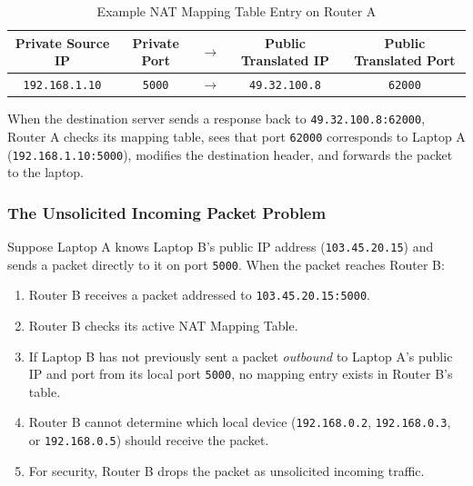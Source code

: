 \documentclass[11pt,a4paper]{article}
\begin{document}
\begin{table}[h!]
\centering
\begin{tabular}{ccccc}
\toprule
\textbf{Private Source IP} & \textbf{Private Port} & $\rightarrow$ & \textbf{Public Translated IP} & \textbf{Public Translated Port} \\
\midrule
\texttt{192.168.1.10} & \texttt{5000} & $\rightarrow$ & \texttt{49.32.100.8} & \texttt{62000} \\
\bottomrule
\end{tabular}
\caption{Example NAT Mapping Table Entry on Router A}
\label{tab:nat_table}
\end{table}

When the destination server sends a response back to \texttt{49.32.100.8:62000}, Router A checks its mapping table, sees that port \texttt{62000} corresponds to Laptop A (\texttt{192.168.1.10:5000}), modifies the destination header, and forwards the packet to the laptop.

\subsubsection{The Unsolicited Incoming Packet Problem}
Suppose Laptop A knows Laptop B's public IP address (\texttt{103.45.20.15}) and sends a packet directly to it on port \texttt{5000}.
When the packet reaches Router B:
\begin{enumerate}
    \item Router B receives a packet addressed to \texttt{103.45.20.15:5000}.
    \item Router B checks its active NAT Mapping Table.
    \item If Laptop B has not previously sent a packet \textit{outbound} to Laptop A's public IP and port from its local port \texttt{5000}, no mapping entry exists in Router B's table.
    \item Router B cannot determine which local device (\texttt{192.168.0.2}, \texttt{192.168.0.3}, or \texttt{192.168.0.5}) should receive the packet.
    \item For security, Router B drops the packet as unsolicited incoming traffic.
\end{enumerate}
\end{document}
